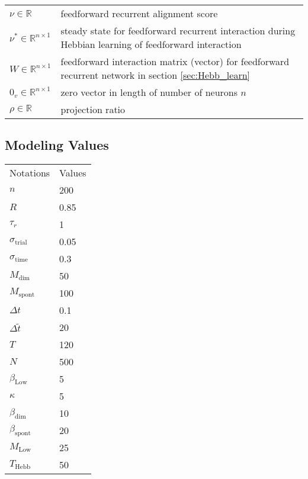 \documentclass[11pt]{article}
\begin{document}
\begin{table}[H]
\begin{tabularx}{\textwidth}{lX}
			$\nu \in \mathbb{R}$ & feedforward recurrent alignment score\\
			
			$\nu^* \in \mathbb{R}^{n \times 1}$ & steady state for feedforward recurrent interaction during Hebbian learning of feedforward interaction \\
			
			$W \in \mathbb{R}^{n \times 1}$ & feedforward interaction matrix (vector) for feedforward recurrent network in section \ref{sec:Hebb_learn} \\
			
			
			$0_v \in \mathbb{R}^{n \times 1}$ & zero vector in length of number of neurons $n$ \\
			
			$\rho \in \mathbb{R}$ & projection ratio \\

		\end{tabularx}
	\end{table}
	
	
	\newpage
	\subsection*{Modeling Values}

	\begin{table}[H]
		\begin{tabular}{ll}
			Notations \hspace{0.5cm} & Values \\
			$n$ & 200 \\
			$R$ & 0.85 \\
			$\tau_r$ & 1 \\
			$\sigma_{\text{trial}}$ & 0.05 \\
			$\sigma_{\text{time}}$ & 0.3 \\
			$M_{\text{dim}}$ & 50 \\
			$M_{\text{spont}}$ & 100\\
			$\Delta t$ & 0.1 \\
			$\Delta \tilde{t}$ & 20\\
			$T$ & 120\\
			$N$ & 500 \\
			$\beta_{\text{Low}}$ & 5\\
			$\kappa$ & 5\\
			$\beta_{\text{dim}}$ & 10\\
			$\beta_{\text{spont}}$ & 20\\
			$M_{\text{Low}}$ & 25\\
			$T_{\text{Hebb}}$ & 50 \\
			
		\end{tabular}
	\end{table}
	
\end{document}
